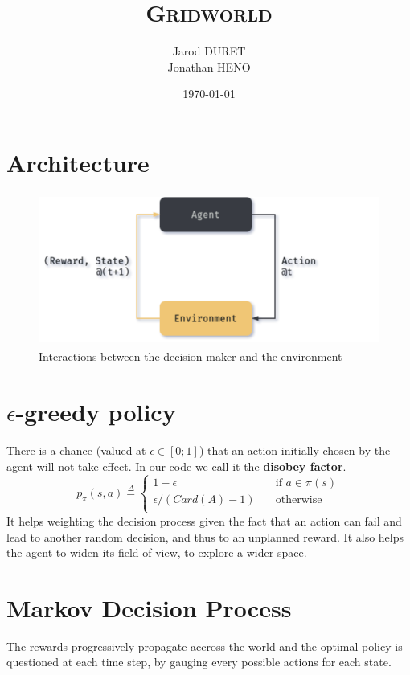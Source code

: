 \documentclass{cfg}
\title{\textsc{Gridworld}}
\author{Jarod DURET\\ Jonathan HENO}
\date{\today}
\begin{document}
\maketitle

\section{Architecture}

\begin{figure}[H]
    \centering
    \includegraphics[height=5cm]{img/architecture}
    \caption{Interactions between the decision maker and the environment}
\end{figure}

\section{$\epsilon$-greedy policy}
There is a chance (valued at $\epsilon \in [0;1]$) that an action initially chosen by the agent will not take effect. In our code we call it the \textbf{disobey factor}.
\begin{equation}
    p_{\pi}(s,a) \overset{\Delta}{=} \begin{cases}
        1-\epsilon \quad &\mbox{if $a \in \pi(s)$}\\
        \epsilon / (Card(A) - 1) \quad &\mbox{otherwise}\\
    \end{cases}
\end{equation}
It helps weighting the decision process given the fact that an action can fail and lead to another random decision, and thus to an unplanned reward.
It also helps the agent to widen its field of view, to explore a wider space.

\newpage
\section{Markov Decision Process}
The rewards progressively propagate accross the world and the optimal policy is questioned at each time step, by gauging every possible actions for each state.\\
\end{document}
